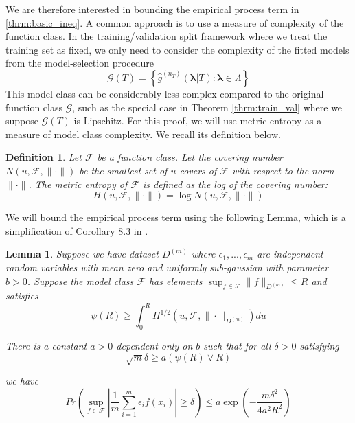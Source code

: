 \documentclass[12pt]{article}
\newtheorem{lemma}{Lemma}
\newtheorem{definition}{Definition}
\begin{document}
We are therefore interested in bounding the empirical process term in \eqref{thrm:basic_ineq}. A common approach is to use a measure of complexity of the function class. In the training/validation split framework where we treat the training set as fixed, we only need to consider the complexity of the fitted models from the model-selection procedure
\begin{equation}
\mathcal{G}(T)=\left\{ \hat{g}^{(n_T)}(\boldsymbol{\lambda}|T) : \boldsymbol{\lambda} \in \Lambda \right\}
\end{equation}
This model class can be considerably less complex compared to the original function class $\mathcal{G}$, such as the special case in Theorem \ref{thrm:train_val} where we suppose $\mathcal{G}(T)$ is Lipschitz. For this proof, we will use metric entropy as a measure of model class complexity. We recall its definition below.
\begin{definition}
	Let $\mathcal{F}$ be a function class. Let the covering number $N(u, \mathcal{F}, \| \cdot \|)$ be the smallest set of $u$-covers of $\mathcal{F}$ with respect to the norm $\| \cdot \|$. The metric entropy of $\mathcal{F}$ is defined as the log of the covering number:
\begin{equation}
H (u, \mathcal{F}, \| \cdot \| ) = \log N(u, \mathcal{F}, \| \cdot \|)
\end{equation}
\end{definition}

We will bound the empirical process term using the following Lemma, which is a simplification of Corollary 8.3 in \citet{van2000empirical}.

\begin{lemma}
	\label{lemma:cor83}
	Suppose we have dataset $D^{(m)}$ where $\epsilon_1,...,\epsilon_m$ are independent random variables with mean zero and uniformly sub-gaussian with parameter $b > 0$. Suppose
	the model class $\mathcal{F}$ has elements $\sup_{f\in\mathcal{F}}\|f\|_{D^{(m)}}\le R$
	and satisfies
	\[
	\psi(R)\ge\int_{0}^{R}H^{1/2}(u,\mathcal{F},\|\cdot\|_{D^{(m)}})du
	\]
	
	
	There is a constant $a > 0$ dependent only on $b$ such that
	for all $\delta>0$ satisfying
	\[
	\sqrt{m}\delta\ge a(\psi(R)\vee R)
	\]
	
	
	we have 
	\[
	Pr\left(\sup_{f\in\mathcal{F}}\left|\frac{1}{m}\sum_{i=1}^{m}\epsilon_{i}f(x_{i})\right|\ge\delta\right)
	\le 
	a\exp\left(-\frac{m\delta^{2}}{4a^{2}R^{2}}\right)
	\]
	
\end{lemma}
\end{document}
